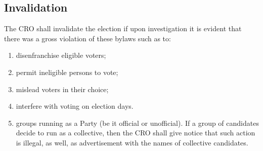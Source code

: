 \subsection{Invalidation}\label{invalidation}

The CRO shall invalidate the election if upon investigation it is
evident that there was a gross violation of these bylaws such as to:

\begin{enumerate}
\def\labelenumi{\arabic{enumi}.}
\item
  disenfranchise eligible voters;
\item
  permit ineligible persons to vote;
\item
  mislead voters in their choice;
\item
  interfere with voting on election days.
\item
  groups running as a Party (be it official or unofficial). If a group
  of candidates decide to run as a collective, then the CRO shall give
  notice that such action is illegal, as well, as advertisement with the
  names of collective candidates.
\end{enumerate}
